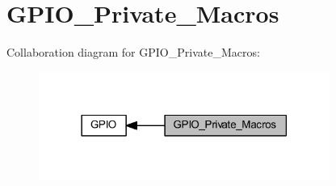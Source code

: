 \hypertarget{group___g_p_i_o___private___macros}{}\section{G\+P\+I\+O\+\_\+\+Private\+\_\+\+Macros}
\label{group___g_p_i_o___private___macros}
Collaboration diagram for G\+P\+I\+O\+\_\+\+Private\+\_\+\+Macros\+:
\nopagebreak
\begin{figure}[H]
\begin{center}
\leavevmode
\includegraphics[width=270pt]{group___g_p_i_o___private___macros}
\end{center}
\end{figure}
